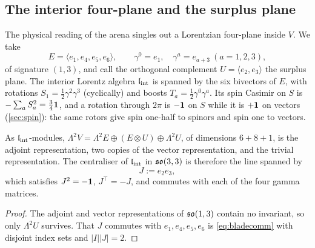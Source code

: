 \subsection{The interior four-plane and the surplus plane}
\label{sec:interior}

The physical reading of the arena singles out a Lorentzian four-plane inside $V$. We take
\[
E=\langle e_1,e_4,e_5,e_6\rangle,\qquad \gamma^0=e_1,\quad \gamma^a=e_{a+3}\ (a=1,2,3),
\]
of signature $(1,3)$, and call the orthogonal complement $U=\langle e_2,e_3\rangle$ the surplus plane. The interior Lorentz
algebra $\mathfrak l_{\rm int}$ is spanned by the six bivectors of $E$, with rotations $S_1=\tfrac12\gamma^2\gamma^3$ (cyclically) and boosts
$T_a=\tfrac12\gamma^0\gamma^a$. Its spin Casimir on $S$ is $-\sum_aS_a^2=\tfrac34\mathbf 1$, and a rotation through $2\pi$ is $-\mathbf 1$
on $S$ while it is $+\mathbf 1$ on vectors (\cref{sec:spin}): the same rotors give spin one-half to spinors and spin one to vectors.

\begin{proposition}
\label{prop:6plus8plus1}
As $\mathfrak l_{\rm int}$-modules, $\Lambda^2V=\Lambda^2E\oplus(E\otimes U)\oplus\Lambda^2U$, of dimensions $6+8+1$, is the adjoint
representation, two copies of the vector representation, and the trivial representation. The centraliser of $\mathfrak l_{\rm int}$ in
$\mathfrak{so}(3,3)$ is therefore the line spanned by
\[
J:=e_2e_3 ,
\]
which satisfies $J^2=-\mathbf 1$, $J^{\!\top}=-J$, and commutes with each of the four gamma matrices.
\end{proposition}

\begin{proof}
The adjoint and vector representations of $\mathfrak{so}(1,3)$ contain no invariant, so only $\Lambda^2U$ survives. That $J$ commutes
with $e_1,e_4,e_5,e_6$ is \eqref{eq:bladecomm} with disjoint index sets and $|I||J|=2$.
\end{proof}

